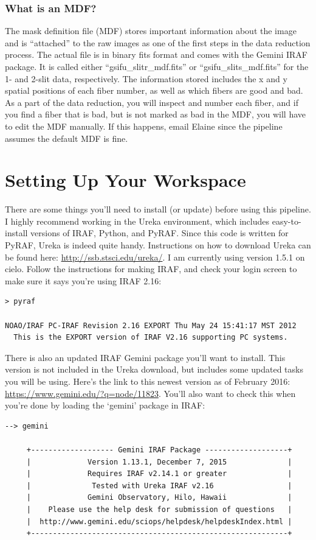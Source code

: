 \documentclass[12pt]{report}
\begin{document}
\subsection{What is an MDF?}
The mask definition file (MDF) stores important information about the image and is ``attached'' to the raw images as one of the first steps in the data reduction process. The actual file is in binary fits format and comes with the Gemini IRAF package. It is called either ``gsifu\_slitr\_mdf.fits'' or ``gsifu\_slits\_mdf.fits'' for the 1- and 2-slit data, respectively. The information stored includes the x and y spatial positions of each fiber number, as well as which fibers are good and bad. As a part of the data reduction, you will inspect and number each fiber, and if you find a fiber that is bad, but is not marked as bad in the MDF, you will have to edit the MDF manually. If this happens, email Elaine since the pipeline assumes the default MDF is fine.

\chapter{Setting Up Your Workspace}

There are some things you'll need to install (or update) before using this pipeline. I highly recommend working in the Ureka environment, which includes easy-to-install versions of IRAF, Python, and PyRAF. Since this code is written for PyRAF, Ureka is indeed quite handy. Instructions on how to download Ureka can be found here: \url{http://ssb.stsci.edu/ureka/}. I am currently using version 1.5.1 on cielo. Follow the instructions for making IRAF, and check your login screen to make sure it says you're using IRAF 2.16:

\begin{verbatim}
> pyraf

NOAO/IRAF PC-IRAF Revision 2.16 EXPORT Thu May 24 15:41:17 MST 2012
  This is the EXPORT version of IRAF V2.16 supporting PC systems.
\end{verbatim}

There is also an updated IRAF Gemini package you'll want to install. This version is not included in the Ureka download, but includes some updated tasks you will be using. Here's the link to this newest version as of February 2016: \url{https://www.gemini.edu/?q=node/11823}. You'll also want to check this when you're done by loading the `gemini' package in IRAF:

\begin{verbatim}
--> gemini

     +------------------- Gemini IRAF Package -------------------+
     |             Version 1.13.1, December 7, 2015              |
     |             Requires IRAF v2.14.1 or greater              |
     |              Tested with Ureka IRAF v2.16                 |
     |             Gemini Observatory, Hilo, Hawaii              |
     |    Please use the help desk for submission of questions   |
     |  http://www.gemini.edu/sciops/helpdesk/helpdeskIndex.html |
     +-----------------------------------------------------------+
\end{verbatim}
\end{document}
